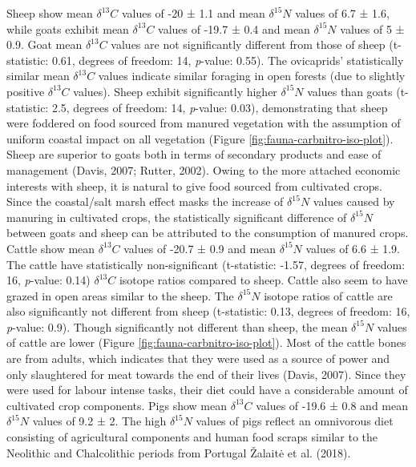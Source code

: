 \documentclass[review]{elsarticle} %
\begin{document}
Sheep show mean \(\delta ^{13}C\) values of -20 ± 1.1\text{\textperthousand} and mean \(\delta ^{15}N\) values of 6.7 ± 1.6\text{\textperthousand}, while goats exhibit mean \(\delta ^{13}C\) values of -19.7 ± 0.4\text{\textperthousand} and mean \(\delta ^{15}N\) values of 5 ± 0.9\text{\textperthousand}. Goat mean \(\delta ^{13}C\) values are not significantly different from those of sheep (t-statistic: 0.61, degrees of freedom: 14, \emph{p}-value: 0.55). The ovicaprids' statistically similar mean \(\delta ^{13}C\) values indicate similar foraging in open forests (due to slightly positive \(\delta ^{13}C\) values). Sheep exhibit significantly higher \(\delta ^{15}N\) values than goats (t-statistic: 2.5, degrees of freedom: 14, \emph{p}-value: 0.03), demonstrating that sheep were foddered on food sourced from manured vegetation with the assumption of uniform coastal impact on all vegetation (Figure \ref{fig:fauna-carbnitro-iso-plot}). Sheep are superior to goats both in terms of secondary products and ease of management (Davis, 2007; Rutter, 2002). Owing to the more attached economic interests with sheep, it is natural to give food sourced from cultivated crops. Since the coastal/salt marsh effect masks the increase of \(\delta ^{15}N\) values caused by manuring in cultivated crops, the statistically significant difference of \(\delta ^{15}N\) between goats and sheep can be attributed to the consumption of manured crops.
Cattle show mean \(\delta ^{13}C\) values of -20.7 ± 0.9\text{\textperthousand} and mean \(\delta ^{15}N\) values of 6.6 ± 1.9\text{\textperthousand}. The cattle have statistically non-significant (t-statistic: -1.57, degrees of freedom: 16, \emph{p}-value: 0.14) \(\delta ^{13}C\) isotope ratios compared to sheep. Cattle also seem to have grazed in open areas similar to the sheep. The \(\delta ^{15}N\) isotope ratios of cattle are also significantly not different from sheep (t-statistic: 0.13, degrees of freedom: 16, \emph{p}-value: 0.9). Though significantly not different than sheep, the mean \(\delta ^{15}N\) values of cattle are lower (Figure \ref{fig:fauna-carbnitro-iso-plot}). Most of the cattle bones are from adults, which indicates that they were used as a source of power and only slaughtered for meat towards the end of their lives (Davis, 2007). Since they were used for labour intense tasks, their diet could have a considerable amount of cultivated crop components. Pigs show mean \(\delta ^{13}C\) values of -19.6 ± 0.8\text{\textperthousand} and mean \(\delta ^{15}N\) values of 9.2 ± 2\text{\textperthousand}. The high \(\delta ^{15}N\) values of pigs reflect an omnivorous diet consisting of agricultural components and human food scraps similar to the Neolithic and Chalcolithic periods from Portugal Žalaitė et al. (2018).
\end{document}

